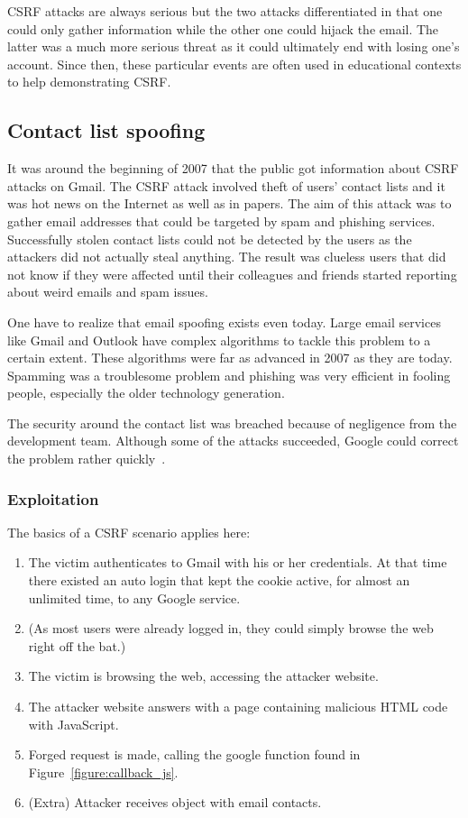\documentclass[a4paper,11pt,openany]{report}
\begin{document}
  CSRF attacks are always serious but the two attacks differentiated in that one could only gather information 
  while the other one could hijack the email. The latter was a much more serious threat as it could ultimately end 
  with losing one's account. Since then, these particular events are often used in educational contexts to help 
  demonstrating CSRF. 

  
  \subsection{Contact list spoofing}
  It was around the beginning of 2007 that the public got information about CSRF attacks on Gmail. The CSRF 
  attack involved theft of users' contact lists and it was hot news on the Internet as well as in papers. The 
  aim of this attack was to gather email addresses that could be targeted by spam and phishing services.
  Successfully stolen contact lists could not be detected by the users as the attackers did not actually steal
  anything. The result was clueless users that did not know if they were affected until their colleagues and 
  friends started reporting about weird emails and spam issues.
  
  One have to realize that email spoofing exists even today. Large email services like Gmail and Outlook have
  complex algorithms to tackle this problem to a certain extent. These algorithms were far as advanced in 2007 as 
  they are today. Spamming was a troublesome problem and phishing was very efficient in fooling people, especially 
  the older technology generation.
  
  The security around the contact list was breached because of negligence from the development team. Although
  some of the attacks succeeded, Google could correct the problem rather quickly~\cite{oreilly}.

  \subsubsection{Exploitation}
  The basics of a CSRF scenario applies here:
  \begin{enumerate}
   \item The victim authenticates to Gmail with his or her credentials. At that time there existed an auto login
   that kept the cookie active, for almost an unlimited time, to any Google service.
   \item (As most users were already logged in, they could simply browse the web right off the bat.)
   \item The victim is browsing the web, accessing the attacker website. 
   \item The attacker website answers with a page containing malicious HTML code with JavaScript.
   \item Forged request is made, calling the google function found in Figure~\ref{figure:callback_js}.
   \item (Extra) Attacker receives object with email contacts. %
  \end{enumerate}
  
\end{document}
